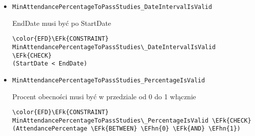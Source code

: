 \documentclass[11pt]{article}
\newcommand{\EFk}[1]{\textcolor{EFk}{\textbf{#1}}} %
\newcommand{\EFhn}[1]{\textcolor{EFhn}{#1}} %
\begin{document}
\begin{itemize}
\item \texttt{MinAttendancePercentageToPassStudies\_DateIntervalIsValid}

EndDate musi być po StartDate
\begin{Code}
\begin{Verbatim}
\color{EFD}\EFk{CONSTRAINT} MinAttendancePercentageToPassStudies\_DateIntervalIsValid \EFk{CHECK}
(StartDate < EndDate)
\end{Verbatim}
\end{Code}
\item \texttt{MinAttendancePercentageToPassStudies\_PercentageIsValid}

Procent obecności musi być w przedziale od 0 do 1 włącznie
\begin{Code}
\begin{Verbatim}
\color{EFD}\EFk{CONSTRAINT} MinAttendancePercentageToPassStudies\_PercentageIsValid \EFk{CHECK}
(AttendancePercentage \EFk{BETWEEN} \EFhn{0} \EFk{AND} \EFhn{1})
\end{Verbatim}
\end{Code}
\end{itemize}
\end{document}
